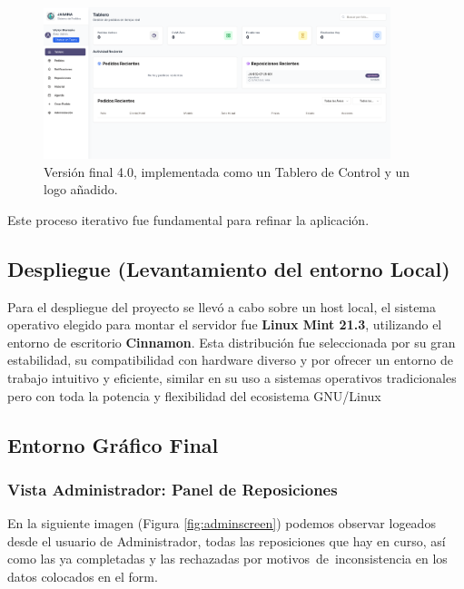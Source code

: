 \documentclass[12pt,letterpaper,spanish]{report}
\begin{document}
\begin{figure}[H]
    \centering
    \includegraphics[width=0.9\textwidth]{V4.0.png}
    \caption{Versión final 4.0, implementada como un Tablero de Control y un logo añadido.}
    \label{fig:v4}
\end{figure}

Este proceso iterativo fue fundamental para refinar la aplicación.

\subsection{Despliegue (Levantamiento del entorno Local)}
Para el despliegue del proyecto se llevó a cabo sobre un host local, el sistema operativo elegido para montar el servidor fue \textbf{Linux Mint 21.3}, utilizando el entorno de escritorio \textbf{Cinnamon}. Esta distribución fue seleccionada por su gran estabilidad, su compatibilidad con hardware diverso y por ofrecer un entorno de trabajo intuitivo y eficiente, similar en su uso a sistemas operativos tradicionales pero con toda la potencia y flexibilidad del ecosistema GNU/Linux

\subsection{Entorno Gráfico Final}
\subsubsection{Vista Administrador: Panel de Reposiciones}
En la siguiente imagen (Figura \ref{fig:adminscreen}) podemos observar logeados desde el usuario de Administrador, todas las reposiciones que hay en curso, así como las ya completadas y las rechazadas por motivos de inconsistencia en los datos colocados en el form.
\end{document}
